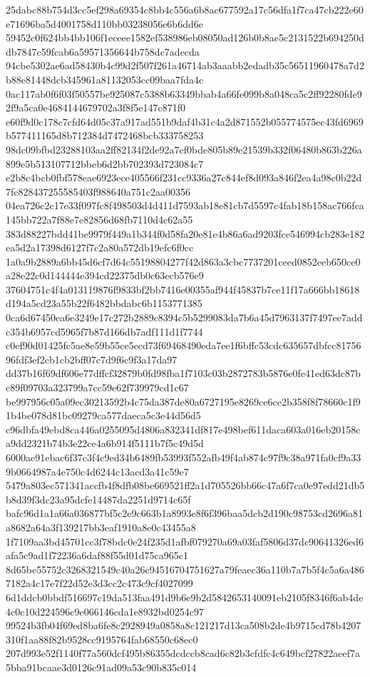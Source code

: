 \documentclass[11pt,a4paper]{article}
\begin{document}
{25dabc88b754d3cc5ef298a69354c8bb4c556a6b8ac677592a17c56dfa1f7ca47cb222e60e71696ba5d4001758d110bb03238056e6b6dd6e
59452c0f624bb4bb106f1eceee1582ef538986eb08050ad126b0b8ae5c2131522b694250ddb7847c59fcab6a59571356644b758dc7adecda
94cbe5302ae6ad58430b4c99d2f507f261a46714ab3aaabb2edadb35c56511960478a7d2b88e81448dcb345961a81132053cc09baa7fda4c
0ac117ab0f6f03f50557be925087c5388b63349bbab4a66fe099b8a048ca5c2ff92280fde92f9a5ca0e4684144679702a3f8f5e147c871f0
e60f9d0c178c7cfd64d05c37a917ad551b9daf4b31c4a2d871552b055774575ec43fd6969b577411165d8b712384d7472468bcb333758253
98dc09bfbd23288103aa2ff82134f2de92a7cf0bde805b89e21539b332f06480b863b226a899e5b513107712bbeb6d2bb702393d723084c7
e2b8c4bcb0fbf578eae6923ece405566f231cc9336a27c844ef8d093a846f2ea4a98c0b22d7fc828437255585403f988640a751c2aa00356
04ea726c2c17e33f097fc8f498503d4d411d7593ab18e81cb7d5597c4fab18b158ac766fca145bb722a7f88e7e82856d68fb7110d4c62a55
383d88227bdd41be9979f449a1b344f0d58fa20e81e4b86a6ad9203fce546994cb283e182ea5d2a17398d6127f7c2a80a572db19efc6f0cc
1a0a9b2889a6bb45d6cf7d64c55198804277f42d863a3cbc7737201ceed0852eeb650ce0a28e22c0d144444e394cd22375db0c63ecb576e9
37604751c4f4a013119876f9833bf2bb7416e00355af944f45837b7ce11f17a666bb18618d194a5cd23a55b22f6482bbdabc6b1153771385
0ca6d67450ea6e3249e17c272b2889c8394c5b5299083da7b6a45d7963137f7497ee7addc354b6957cd5965f7b87d166db7adf111d1f7744
c0ef90d01425fc5ae8e59b55ce5ecd73f69468490eda7ee1f6bffc53cdc635657dbfcc8175696fdf3ef2cb1cb2bff07c7d9f6c9f3a17da97
dd37b16f69df606e77dffcf32879b0fd98fba1f7103c03b2872783b5876e0fe41ed63dc87bc89f09703a323799a7cc59e62f739979cd1c67
be997956c05a09ec30213592b4c75da387de80a6727195e8269ce6ce2b358f8f78660c1f91b4be078d81bc09279ca577daeca5c3e44d56d5
c96dbfa49ebd8ca446a0255095d4806a832341df817e498bef611daca603a016eb20158ca9dd2321b74b3e22ce4a6b914f5111b7f5c49d5d
6000ae91ebac6f37c3f4c9ed34b6489fb53993f552afb49f4ab874c97f9c38a971fa0cf9a339b0664987a4e750c4d6244c13acd3a41c59e7
5479a803ec571341accfb4f8dfb08be669521ff2a1d705526bb66c47a6f7ca0e97edd21db5b8d39f3dc23a95dcfe14487da2251d9714c65f
bafc96d1a1a66a036877bf5c2e9c663b1a8993e8f6f396baa5dcb2d190c98753cd2696a81a8682a64a3f139217bb3eaf1910a8e0c43455a8
1f7109aa3bd45701cc3f78bdc0e24f235d1afbf079270a69a03faf5806d37dc90641326ed6afa5c9ad1f72236a6daf88f55d01d75ca965c1
8d65be55752c3268321549c40a26c94516704751627a79feaec36a110b7a7b5f4c5a6a4867182a4c17e7f22d52e3d3cc2c473c9cf4027099
6d1ddcb0bbdf516697c19da513faa491d9b6e9b2d5842653140091eb2105f8346f6ab4de4c0c10d224596c9e066146cda1e8932bd0254c97
99524b3fb04f69ed8ba6fe8c2928949a0858a8c121217d13ca508b2de4b9715cd78b4207310f1aa88f82b9528cc9195764fab68550c68ec0
207d993e52f1140f77a560dcf495b86355dcdccb8cad6c82b3cfdfc4c649bcf27822aeef7a5bba91bcaae3d0126c91ad09a53c90b835c014
}
\end{document}
